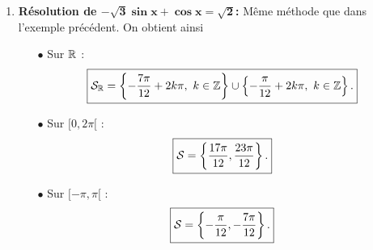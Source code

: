 \documentclass[a4paper, 11pt]{article}
\begin{document}
\begin{correction}
\begin{enumerate}
\item  \textbf{R\'esolution de $\mathbf{ -\sqrt{3}\sin{x}+\cos{x}=\sqrt{2}}$:}
M\^{e}me m\'ethode que dans l'exemple pr\'ec\'edent. On obtient ainsi
\begin{itemize}
\item[$\bullet$] Sur $\mathbb{R}$ : 
$$\fbox{$\mathcal{S}_{\mathbb{R}}=\left\lbrace \displaystyle-\frac{7\pi}{12}+2k\pi,\ k\in\mathbb{Z}  \right\rbrace\cup \left\lbrace - \displaystyle\frac{\pi}{12}+2k\pi,\ k\in\mathbb{Z}  \right\rbrace .$}$$
\end{itemize}
\begin{minipage}[c]{0.45\linewidth}
\begin{itemize}
\item[$\bullet$] Sur $\lbrack 0,2\pi\lbrack$ : 
$$\fbox{$\mathcal{S}=\left\lbrace \displaystyle\frac{17\pi}{12},\displaystyle\frac{23\pi}{12} \right \rbrace.$}$$
\item[$\bullet$] Sur $\lbrack -\pi,\pi\lbrack$ :
$$\fbox{$\mathcal{S}=\left\lbrace -\displaystyle\frac{\pi}{12},-\displaystyle\frac{7\pi}{12} \right \rbrace.$}$$
\end{itemize}
\end{minipage}
\quad

\begin{center}
\end{center}


\end{enumerate}
\end{correction}
\end{document}

